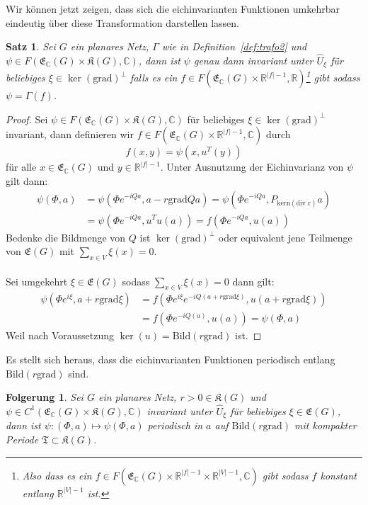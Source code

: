 \documentclass[11pt,a4paper,leqno]{report}
\newtheorem{proposition}{Satz}[chapter]
\newtheorem{corollary}[theorem]{Folgerung}
\numberwithin{equation}{chapter}
\begin{document}
\noindent
Wir können jetzt zeigen, dass sich die eichinvarianten Funktionen umkehrbar eindeutig über diese Transformation darstellen lassen.
\begin{proposition}\label{prop:eich_darstell}
	Sei $G$ ein planares Netz, $\Gamma$ wie in Definition~\ref{def:trafo2} und $\psi\in F(\mathfrak{E}_\mathbb{C}(G)\times\mathfrak{K}(G), \mathbb{C})$, dann ist $\psi$ genau dann invariant unter $\hat{U}_\xi$ f\"ur beliebiges $\xi\in\ker(\mathrm{grad})^\perp$ falls es ein $f\in F(\mathfrak{E}_\mathbb{C}(G)\times\mathbb{R}^{|f|-1}, \mathbb{R})$\footnote{Also dass es ein $f\in F(\mathfrak{E}_\mathbb{C}(G)\times\mathbb{R}^{|f|-1}\times\mathbb{R}^{|V|-1}, \mathbb{C})$ gibt sodass $f$ konstant entlang $\mathbb{R}^{|V|-1}$ ist.} gibt sodass $\psi=\Gamma(f)$.
\end{proposition}
\begin{proof}
Sei $\psi\in F(\mathfrak{E}_\mathbb{C}(G)\times\mathfrak{K}(G), \mathbb{C})$ f\"ur beliebiges $\xi\in\ker(\mathrm{grad})^\perp$ invariant, dann definieren wir $f\in F(\mathfrak{E}_\mathbb{C}(G)\times\mathbb{R}^{|f|-1}, \mathbb{C})$ durch 
\begin{equation*}
	f(x,y) = \psi(x,u^T(y))
\end{equation*}
für alle $x\in \mathfrak{E}_\mathbb{C}(G)$ und $y \in \mathbb{R}^{|f|-1}$.
Unter Ausnutzung der Eichinvarianz von $\psi$ gilt dann:
\begin{align*}
	\psi(\Phi, a) &= \psi(\Phi e^{-iQa}, a-r\text{grad}Qa)=\psi(\Phi e^{-iQa}, P_{\text{kern}(\text{div r})}a)\\&=\psi(\Phi e^{-iQa}, u^Tu(a))
	=f(\Phi e^{-iQa}, u(a))
\end{align*}
Bedenke die Bildmenge von $Q$ ist $\ker(\mathrm{grad})^\perp$ oder equivalent jene Teilmenge von $\mathfrak{E}(G)$ mit $\sum_{x\in V}\xi(x)=0$.\\
\\
Sei umgekehrt $\xi\in\mathfrak{E}(G)$ sodass $\sum_{x\in V}\xi(x)=0$ dann gilt:
\begin{align*}
	\psi(\Phi e^{i\xi}, a + r\mathrm{grad}\xi) &= f(\Phi e^{i\xi} e^{-iQ(a + r\mathrm{grad}\xi)}, u(a + r\mathrm{grad}\xi))\\&=f(\Phi e^{-iQ(a )}, u(a))=\psi(\Phi, a)
\end{align*}
Weil nach Voraussetzung $\ker(u)=\mathrm{Bild}(r\mathrm{grad})$ ist.
\end{proof}
\noindent
Es stellt sich heraus, dass die eichinvarianten Funktionen periodisch entlang $\mathrm{Bild}(r\mathrm{grad})$ sind.
\begin{corollary}\label{thm:corr_period}
	Sei $G$ ein planares Netz, $r>0\in\mathfrak{K}(G)$ und $\psi\in C^1(\mathfrak{E}_\mathbb{C}(G)\times\mathfrak{K}(G), \mathbb{C})$ invariant unter $\hat{U}_\xi$ f\"ur beliebiges $\xi\in\mathfrak{E}(G)$, dann ist $\psi:(\Phi,a)\mapsto\psi(\Phi, a)$ periodisch in $a$ auf $\mathrm{Bild}(r\mathrm{grad})$ mit kompakter Periode \(\mathfrak{T}\subset\mathfrak{K}(G)\).
\end{corollary}
\end{document}
